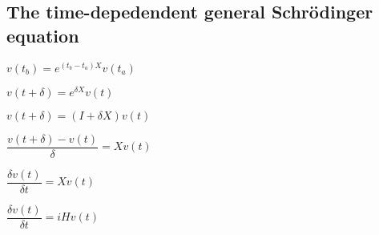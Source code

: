 
\subsection{The time-depedendent general Schrödinger equation}

\(v(t_b)=e^{(t_b-t_a)X}v(t_a)\)

\(v(t+\delta )=e^{\delta X}v(t)\)

\(v(t+\delta )=(I+\delta X)v(t)\)

\(\dfrac{v(t+\delta )-v(t)}{\delta }=Xv(t)\)

\(\dfrac{\delta v(t)}{\delta t}=Xv(t)\)

\(\dfrac{\delta v(t)}{\delta t}=iHv(t)\)

